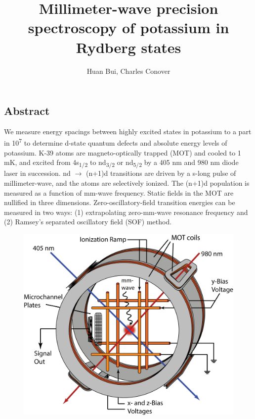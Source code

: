 \documentclass[landscape]{sciposter}
\title{Millimeter-wave precision spectroscopy of potassium in Rydberg states}
\author{Huan Bui, Charles Conover}
\institute{Department of Physics and Astronomy, Colby College, Waterville, Maine}
\begin{document}
\renewcommand{\titlesize}{\fontsize{60 pt}{75 pt}\selectfont}
\renewcommand{\authorsize}{\fontsize{38 pt}{45 pt}\selectfont}
\renewcommand{\instsize}{\fontsize{38 pt}{45 pt}\selectfont}
\maketitle

\fontsize{30 pt}{38 pt}\selectfont

\begin{multicols}{4}
\setlength{\columnseprule}{0pt}

\section*{\large Abstract}
{\normalfont We measure energy spacings between highly excited states in potassium to a part in 10\textsuperscript{7} to determine d-state quantum defects and absolute energy levels of potassium. K-39 atoms are magneto-optically trapped (MOT) and cooled to 1 mK, and excited from 4s\textsubscript{1/2} to nd\textsubscript{3/2} or nd\textsubscript{5/2} by a 405 nm and 980 nm diode laser in succession. nd $\rightarrow$ (n+1)d transitions are driven by a \textmu s-long pulse of millimeter-wave, and the atoms are selectively ionized. The (n+1)d population is measured as a function of mm-wave frequency. Static fields in the MOT are nullified in three dimensions. Zero-oscillatory-field transition energies can be measured in two ways: (1) extrapolating zero-mm-wave resonance frequency and (2) Ramsey's separated oscillatory field (SOF) method.}

\begin{figure}
\begin{center}
\includegraphics[scale = 0.95]{MOT.png}
\end{center}
\end{figure}


\end{multicols}
\end{document}
